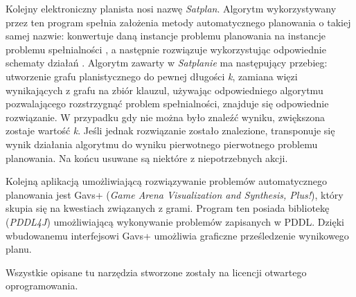 Kolejny elektroniczny planista nosi nazwę \textit{Satplan}. Algorytm wykorzystywany przez ten program spełnia założenia metody automatycznego planowania o takiej samej nazwie: konwertuje daną instancje problemu planowania na instancje problemu spełnialności , a następnie rozwiązuje wykorzystując odpowiednie schematy działań . Algorytm zawarty w \textit{Satplanie} ma następujący przebieg: utworzenie grafu planistycznego do pewnej długości \textit{k}, zamiana więzi wynikających z grafu na zbiór klauzul, używając odpowiedniego algorytmu pozwalającego rozstrzygnąć problem spełnialności, znajduje się odpowiednie rozwiązanie. W przypadku gdy nie można było znaleźć wyniku, zwiększona zostaje wartość \textit{k}. Jeśli jednak rozwiązanie zostało znalezione, transponuje się wynik działania algorytmu do wyniku pierwotnego pierwotnego problemu planowania. Na końcu usuwane są niektóre z niepotrzebnych akcji.

Kolejną aplikacją umożliwiającą rozwiązywanie problemów automatycznego planowania jest Gavs+ (\textit{Game Arena Visualization and Synthesis, Plus!}), który skupia się na kwestiach związanych z grami. Program ten posiada bibliotekę (\textit{PDDL4J}) umożliwiającą wykonywanie problemów zapisanych w PDDL. Dzięki wbudowanemu interfejsowi Gavs+ umożliwia graficzne prześledzenie wynikowego planu.

Wszystkie opisane tu narzędzia stworzone zostały na licencji otwartego oprogramowania.

